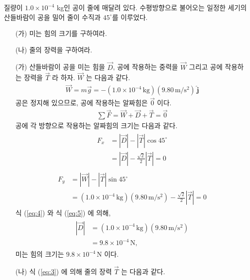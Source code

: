 \documentclass[floatfix,nofootinbib,superscriptaddress,fleqn,preprint]{revtex4}
\begin{document}
질량이 $1.0\times 10^{-4}$ kg인 공이 줄에 매달려 있다. 수평방향으로
불어오는 일정한 세기의 산들바람이 공을 밀어 줄이 수직과 $45^\circ$를
이루었다.
\begin{itemize}
\item[(가)] 미는 힘의 크기를 구하여라.
\item[(나)] 줄의 장력을 구하여라.
\end{itemize}

\begin{itemize}
  \item[(가)]
  산들바람이 공을 미는 힘을 $\vec{D}$, 공에 작용하는 중력을
  $\vec{W}$ 그리고 공에 작용하는 장력을 $\vec{T}$ 라 하자.
  $\vec{W}$ 는 다음과 같다.
  \begin{align}
    \vec{W} = m\vec{g} 
    = -(1.0\times 10^{-4}\,\mathrm{kg})(9.80\,\mathrm{m/s^2})\,\hat{\bm{j}}
  \end{align}
  공은 정지해 있으므로, 공에 작용하는 알짜힘은 $\vec{0}$ 이다.
  \begin{align}\label{eq:3}
    \sum\vec{F}=\vec{W}+\vec{D}+\vec{T} = \vec{0}
  \end{align}
공에 각 방향으로 작용하는 알짜힘의 크기는 다음과 같다.
\begin{align}\label{eq:4}
  \begin{split}
    F_x &= |\vec{D}|-|\vec{T}|\cos{45^{\circ}} \\
    &= |\vec{D}|-\frac{\sqrt{2}}{2}|\vec{T}|
    = 0   
  \end{split}
\end{align}
\begin{align}\label{eq:5}
  \begin{split}
    F_y &= |\vec{W}|-|\vec{T}|\sin{45^{\circ}}  \\
    &= (1.0\times 10^{-4}\,\mathrm{kg})(9.80\,\mathrm{m/s^2})
    -\frac{\sqrt{2}}{2}|\vec{T}|
    = 0
  \end{split}
\end{align}
식 (\ref{eq:4}) 와 식 (\ref{eq:5}) 에 의해,
\begin{align}
  \begin{split}
    |\vec{D}| &= (1.0\times 10^{-4}\,\mathrm{kg})(9.80\,\mathrm{m/s^2})  \\
    &=9.8\times 10^{-4}\,\mathrm{N},
  \end{split}
\end{align}
미는 힘의 크기는 $9.8\times 10^{-4}\,\mathrm{N}$ 이다.
\item[(나)] 식 (\ref{eq:3}) 에 의해 줄의 장력 $\vec{T}$ 는 다음과 같다.

\end{itemize}
\end{document}
